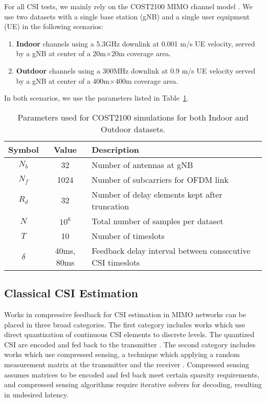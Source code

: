 For all CSI tests, we mainly rely on the COST2100 MIMO channel model \cite{ref:liu2012cost2100}. We use two datasets with a single base station (gNB) and a single user equipment (UE) in the following scenarios:
\begin{enumerate}
	\item \textbf{Indoor} channels using a 5.3GHz downlink at
	0.001 m/s UE velocity, served by a
	gNB at center of a $20$m$\times 20$m coverage area.
	\item \textbf{Outdoor} channels using a 300MHz downlink at 0.9 m/s UE velocity served by a gNB at center 
	of a $400$m$\times 400$m coverage area.
\end{enumerate}
In both scenarios, we use the parameters listed in Table~\ref{tab:cost-params}.
\begin{table}[]
\centering
\caption{Parameters used for COST2100 simulations for both Indoor and Outdoor datasets.}
\label{tab:cost-params}
\begin{tabular}{c|c|l}
\toprule
\textbf{Symbol} & \textbf{Value} & \textbf{Description} \\ \midrule
$N_b$ 			& 32			 & Number of antennas at gNB  \\ \hline
$N_f$ 			& 1024			 & Number of subcarriers for OFDM link  \\ \hline
$R_d$ 			& 32			 & Number of delay elements kept after truncation  \\ \hline
$N$ 			& $10^6$		 & Total number of samples per dataset  \\ \hline
$T$ 			& 10		 	 & Number of timeslots  \\ \hline
$\delta$		& 40ms, 80ms	 & Feedback delay interval between consecutive CSI timeslots  \\ \bottomrule
\end{tabular}
\end{table}

\subsection{Classical CSI Estimation}
\label{sect:classic_estimation}

Works in compressive feedback for CSI estimation in MIMO networks can be placed in three broad categories. The first category includes works which use direct quantization of continuous CSI elements to discrete levels. The quantized CSI are encoded and fed back to the transmitter \cite{ref:makki2012hybrid,ref:shirani2009channel}. The second category includes works which use compressed sensing, a technique which applying a random measurement matrix at the transmitter and the receiver \cite{ref:rao2014distributed, ref:eltayeb2014compressive}. Compressed sensing assumes matrices to be encoded and fed back meet certain sparsity requirements, and compressed sensing algorithms require iterative solvers \cite{ref:do2008sparsity} for decoding, resulting in undesired latency.

